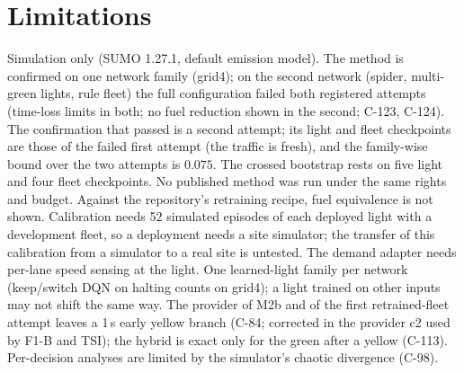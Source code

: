 \documentclass[11pt]{article}
\begin{document}
\section{Limitations}
Simulation only (SUMO 1.27.1, default emission model). The method is confirmed on one network family (grid4); on the second network (spider, multi-green
lights, rule fleet) the full configuration failed both registered attempts (time-loss limits in both; no fuel reduction shown in the second;
C-123, C-124). The confirmation that
passed is a second attempt; its light and fleet checkpoints are those of the failed first attempt (the traffic is fresh), and the
family-wise bound over the two attempts is $0.075$. The crossed bootstrap rests on five light and four fleet checkpoints. No published
method was run under the same rights and budget. Against the repository's retraining recipe, fuel equivalence is not shown. Calibration needs 52 simulated episodes of each deployed light with a development fleet, so a deployment needs a site simulator; the
transfer of this calibration from a simulator to a real site is untested. The demand adapter needs per-lane speed sensing at the light. One learned-light family per network (keep/switch DQN on halting counts on grid4); a
light trained on other inputs may not shift the same way. The provider of M2b and of the first retrained-fleet attempt leaves a 1\,s early yellow branch (C-84;
corrected in the provider c2 used by F1-B and TSI); the hybrid is exact only for the green after a yellow (C-113). Per-decision analyses are limited by the simulator's chaotic divergence
(C-98).
\end{document}
